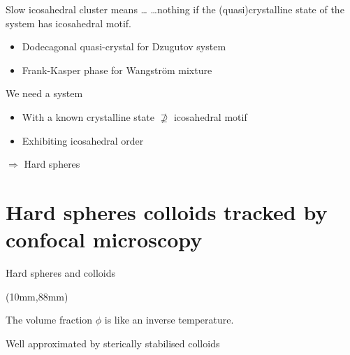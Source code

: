 \begin{frame}{Slow icosahedral cluster means \dots}
\dots \alert{nothing} if the (quasi)crystalline state of the system has icosahedral motif.
\begin{itemize}
	\item Dodecagonal quasi-crystal for Dzugutov system\\{\footnotesize\citet{Doye2003}}
	\item Frank-Kasper phase for Wangstr\"om mixture\\{\footnotesize\citet{Pedersen2010, Coslovich2011}}
\end{itemize}

\begin{block}{We need a system}
\begin{itemize}
	\item With a known crystalline state $\nsupseteq$ icosahedral motif
	\item Exhibiting icosahedral order
\end{itemize}
\centering$\Longrightarrow$ Hard spheres
\end{block}
\end{frame}

\section{Hard spheres colloids tracked by confocal microscopy}
\begin{frame}{Hard spheres and colloids}
	\begin{textblock*}{0.6\textwidth}(10mm,88mm)
		\only<2>{\simplephasediagram{}}%
	\end{textblock*}
	The volume fraction $\phi$ is like an inverse temperature.
	\bigskip
	\def\svgwidth{\textwidth}
	
	\bigskip
	Well approximated by sterically stabilised colloids\\
	\begin{footnotesize}\citet{pusey1987ogt}\end{footnotesize}
\end{frame}

